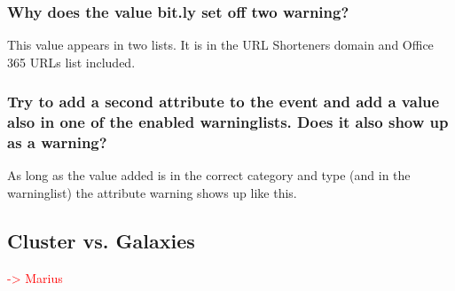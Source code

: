 \subsubsection{Why does the value bit.ly set off two warning?}
This value appears in two lists. It is in the URL Shorteners domain and Office 365 URLs list included.

\subsubsection{Try to add a second attribute to the event and add a value also in one of the enabled warninglists. Does it also show up as a warning?}
As long as the value added is in the correct category and type (and in the warninglist) the attribute warning shows up like this.

\subsection{Cluster vs. Galaxies}
\textcolor{red}{-> Marius}


